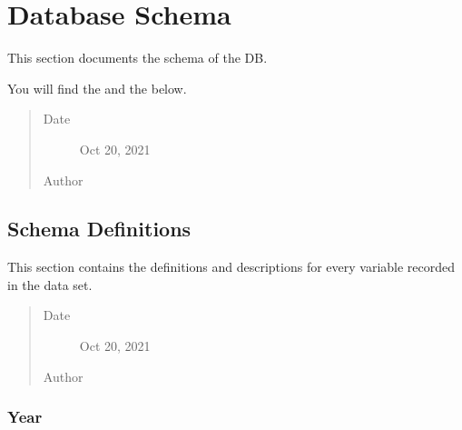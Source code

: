 \documentclass[letterpaper,10pt,english]{sphinxmanual}
\begin{document}
\chapter{Database Schema}
\label{\detokenize{database_schema:database-schema}}\label{\detokenize{database_schema:id1}}\label{\detokenize{database_schema::doc}}
\begin{sphinxShadowBox}

\sphinxAtStartPar
This section documents the schema of the DB.

\sphinxAtStartPar
You will find the {\hyperref[\detokenize{database_schema:schema-definitions}]{}} and the {\hyperref[\detokenize{database_schema:reference-tables}]{}} below.
\begin{quote}\begin{description}
\item[{Date}] \leavevmode
\sphinxAtStartPar
Oct 20, 2021

\item[{Author}] \leavevmode
\sphinxAtStartPar
{}

\end{description}\end{quote}
\end{sphinxShadowBox}


\section{Schema Definitions}
\label{\detokenize{database_schema:schema-definitions}}
\begin{sphinxShadowBox}

\sphinxAtStartPar
This section contains the definitions and descriptions for every variable recorded in the data set.
\begin{quote}\begin{description}
\item[{Date}] \leavevmode
\sphinxAtStartPar
Oct 20, 2021

\item[{Author}] \leavevmode
\sphinxAtStartPar
{}

\end{description}\end{quote}
\end{sphinxShadowBox}


\subsection{Year}
\label{\detokenize{database_schema:year}}
\end{document}
